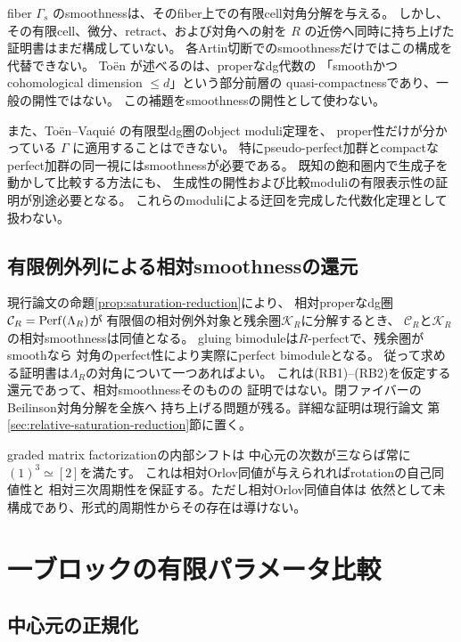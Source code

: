\begin{remark}[現時点で未解決の点]\label{rem:relative-saturation-gap}
 fiber \(\Gamma_s\) のsmoothnessは、そのfiber上での有限cell対角分解を与える。
 しかし、その有限cell、微分、retract、および対角への射を
 \(R\) の近傍へ同時に持ち上げた証明書はまだ構成していない。
 各Artin切断でのsmoothnessだけではこの構成を代替できない。
 Toën \cite[Lemma 3.14]{ToenFinitude} が述べるのは、properなdg代数の
 「smoothかつcohomological dimension \(\le d\)」という部分前層の
 quasi-compactnessであり、一般の開性ではない。
 この補題をsmoothnessの開性として使わない。

 また、Toën--Vaquié \cite[Theorem 3.6]{TV} の有限型dg圏のobject moduli定理を、
 proper性だけが分かっている \(\Gamma\) に適用することはできない。
 特にpseudo-perfect加群とcompactなperfect加群の同一視にはsmoothnessが必要である。
 既知の飽和圏内で生成子を動かして比較する方法にも、
 生成性の開性および比較moduliの有限表示性の証明が別途必要となる。
 これらのmoduliによる迂回を完成した代数化定理として扱わない。
\end{remark}


\subsection{有限例外列による相対smoothnessの還元}
現行論文の命題\ref{prop:saturation-reduction}により、
相対properなdg圏$\mathcal C_R=\operatorname{Perf}(\Lambda_R)$が
有限個の相対例外対象と残余圏$\mathcal K_R$に分解するとき、
$\mathcal C_R$と$\mathcal K_R$の相対smoothnessは同値となる。
gluing bimoduleは$R$-perfectで、残余圏がsmoothなら
対角のperfect性により実際にperfect bimoduleとなる。
従って求める証明書は$\Lambda_R$の対角について一つあればよい。
これは(RB1)--(RB2)を仮定する還元であって、相対smoothnessそのものの
証明ではない。閉ファイバーのBeilinson対角分解を全族へ
持ち上げる問題が残る。詳細な証明は現行論文
第\ref{sec:relative-saturation-reduction}節に置く。

graded matrix factorizationの内部シフトは
中心元の次数が三ならば常に$(1)^3\simeq[2]$を満たす。
これは相対Orlov同値が与えられればrotationの自己同値性と
相対三次周期性を保証する。ただし相対Orlov同値自体は
依然として未構成であり、形式的周期性からその存在は導けない。

\section{一ブロックの有限パラメータ比較}

\subsection{中心元の正規化}

